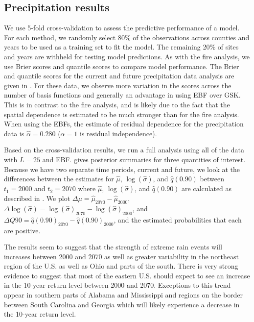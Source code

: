 \subsection{Precipitation results} \label{ebs:results-precip}

We use 5-fold cross-validation to assess the predictive performance of a model.
For each method, we randomly select 80\% of the observations across counties and years to be used as a training set to fit the model.
The remaining 20\% of sites and years are withheld for testing model predictions.
As with the fire analysis, we use Brier scores and quantile scores to compare model performance.
The Brier and quantile scores for the current and future precipitation data analysis are given in .
For these data, we observe more variation in the scores across the number of basis functions and generally an advantage in using EBF over GSK.
This is in contrast to the fire analysis, and is likely due to the fact that the spatial dependence is estimated to be much stronger than for the fire analysis.
When using the EBFs, the estimate of residual dependence for the precipitation data is $\hat{\alpha} = 0.280$ ($\alpha = 1$ is residual independence).

Based on the cross-validation results, we run a full analysis using all of the data with $L = 25$ and EBF.
 gives posterior summaries for three quantities of interest.
Because we have two separate time periods, current and future, we look at the differences between the estimates for $\hat{\mu}$, $\log(\hat{\sigma})$, and $\hat{q}(0.90)$ between $t_1 = 2000$ and $t_2 = 2070$ where $\hat{\mu}$, $\log(\hat{\sigma})$, and $\hat{q}(0.90)$ are calculated as described in .
We plot \mbox{$\Delta \mu = \hat{\mu}_{2070} - \hat{\mu}_{2000}$}, \mbox{$\Delta \log(\hat{\sigma}) = \log(\hat{\sigma})_{2070} - \log(\hat{\sigma})_{2000}$}, and \mbox{$\Delta Q90 = \hat{q}(0.90)_{2070} - \hat{q}(0.90)_{2000}$}, and the estimated probabilities that each are positive.

The results seem to suggest that the strength of extreme rain events will increases between 2000 and 2070 as well as greater variability in the northeast region of the U.S. as well as Ohio and parts of the south.
There is very strong evidence to suggest that most of the eastern U.S. should expect to see an increase in the 10-year return level between 2000 and 2070.
Exceptions to this trend appear in southern parts of Alabama and Mississippi and regions on the border between South Carolina and Georgia which will likely experience a decrease in the 10-year return level.

